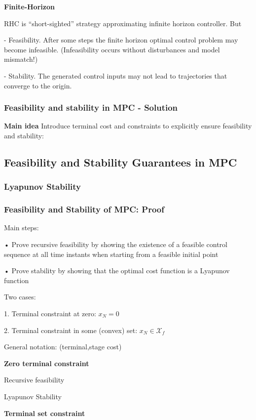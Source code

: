 \textbf{Finite-Horizon}

RHC is “short-sighted” strategy approximating infinite horizon controller.
But

- Feasibility. After some steps the finite horizon optimal control problem
may become infeasible. (Infeasibility occurs without disturbances and
model mismatch!)

- Stability. The generated control inputs may not lead to trajectories that
converge to the origin.

\subsubsection{Feasibility and stability in MPC - Solution}

\textbf{Main idea} Introduce terminal cost and constraints to explicitly ensure
feasibility and stability:


\subsection{Feasibility and Stability Guarantees in MPC}

\subsubsection{Lyapunov Stability}


\subsubsection{Feasibility and Stability of MPC: Proof}

Main steps:

• Prove recursive feasibility by showing the existence of a feasible control
sequence at all time instants when starting from a feasible initial point

• Prove stability by showing that the optimal cost function is a Lyapunov
function

Two cases:

1. Terminal constraint at zero: $x_N = 0$

2. Terminal constraint in some (convex) set: $x_N \in \mathcal{X}_f$

General notation:
(terminal,stage cost)

\textbf{Zero terminal constraint}

Recursive feasibility

Lyapunov Stability

\textbf{Terminal set constraint}

